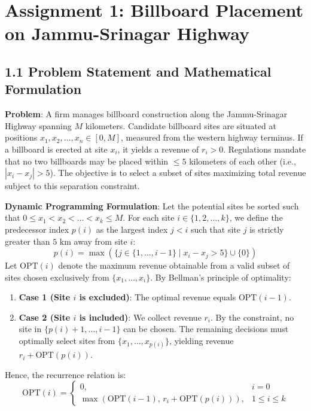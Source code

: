 \documentclass[12pt]{article}
\begin{document}
\vspace{0.3cm}

\section*{Assignment 1: Billboard Placement on Jammu-Srinagar Highway}

\subsection*{1.1 Problem Statement and Mathematical Formulation}
\textbf{Problem}: A firm manages billboard construction along the Jammu-Srinagar Highway spanning $M$ kilometers. Candidate billboard sites are situated at positions $x_1, x_2, \dots, x_n \in [0, M]$, measured from the western highway terminus. If a billboard is erected at site $x_i$, it yields a revenue of $r_i > 0$. Regulations mandate that no two billboards may be placed within $\le 5$ kilometers of each other (i.e., $|x_i - x_j| > 5$). The objective is to select a subset of sites maximizing total revenue subject to this separation constraint.

\textbf{Dynamic Programming Formulation}:
Let the potential sites be sorted such that $0 \le x_1 < x_2 < \dots < x_k \le M$. For each site $i \in \{1, 2, \dots, k\}$, we define the predecessor index $p(i)$ as the largest index $j < i$ such that site $j$ is strictly greater than $5\text{ km}$ away from site $i$:
\[
p(i) = \max \left(\{j \in \{1, \dots, i-1\} \mid x_i - x_j > 5\} \cup \{0\}\right)
\]
Let $\text{OPT}(i)$ denote the maximum revenue obtainable from a valid subset of sites chosen exclusively from $\{x_1, \dots, x_i\}$. By Bellman's principle of optimality:
\begin{enumerate}
    \item \textbf{Case 1 (Site $i$ is excluded)}: The optimal revenue equals $\text{OPT}(i-1)$.
    \item \textbf{Case 2 (Site $i$ is included)}: We collect revenue $r_i$. By the constraint, no site in $\{p(i)+1, \dots, i-1\}$ can be chosen. The remaining decisions must optimally select sites from $\{x_1, \dots, x_{p(i)}\}$, yielding revenue $r_i + \text{OPT}(p(i))$.
\end{enumerate}
Hence, the recurrence relation is:
\[
\text{OPT}(i) = \begin{cases}
0, & i = 0 \\
\max\left(\text{OPT}(i-1), \, r_i + \text{OPT}(p(i))\right), & 1 \le i \le k
\end{cases}
\]
\end{document}
